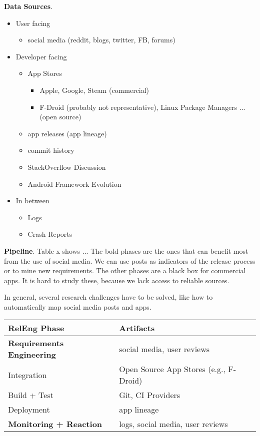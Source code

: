 \documentclass[a4paper]{article}
\newcommand{\smallsection}[1]{\noindent \textbf{#1}. }
\begin{document}
\smallsection{Data Sources}
\begin{itemize}
    \item User facing
        \begin{itemize}
            \item social media (reddit, blogs, twitter, FB, forums)
        \end{itemize}
    \item Developer facing
        \begin{itemize}
            \item App Stores
                \begin{itemize}
                    \item Apple, Google, Steam (commercial)
                    \item F-Droid (probably not representative), Linux Package Managers ... (open source)
                \end{itemize}
            \item app releases (app lineage)
            \item commit history
            \item StackOverflow Discussion
            \item Android Framework Evolution
        \end{itemize}
    \item In between
        \begin{itemize}
            \item Logs
            \item Crash Reports
        \end{itemize}
\end{itemize}

\smallsection{Pipeline} Table x shows ... The bold phases are the ones that can benefit most from the use of social media. We can use posts as indicators of the release process or to mine new requirements. The other phases are a black box for commercial apps. It is hard to study these, because we lack access to reliable sources.

In general, several research challenges have to be solved, like how to automatically map social media posts and apps.

\begin{table}[h]
    \centering
    \begin{tabular}{l|l}
        \hline
        RelEng Phase & Artifacts \\ \hline 
        \textbf{Requirements Engineering} & social media, user         reviews \\ 
        Integration & Open Source App Stores (e.g., F-Droid) \\
        Build + Test & Git, CI Providers \\
        Deployment & app lineage \\
        \textbf{Monitoring + Reaction} & logs, social media, user
        reviews  \\ \hline
    \end{tabular}
\end{table}
\end{document}
